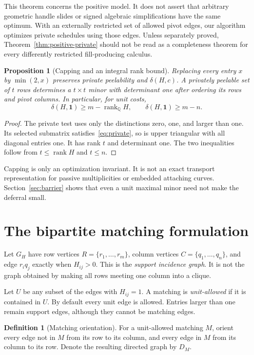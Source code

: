 \documentclass[11pt,a4paper]{article}
\newtheorem{proposition}[theorem]{Proposition}
\theoremstyle{definition}
\newtheorem{definition}[theorem]{Definition}
\theoremstyle{remark}
\begin{document}
This theorem concerns the positive model. It does not assert that arbitrary
geometric handle slides or signed algebraic simplifications have the same
optimum. With an externally restricted set of allowed pivot edges, our
algorithm optimizes private schedules using those edges. Unless separately
proved, Theorem~\ref{thm:positive-private} should not be read as a
completeness theorem for every differently restricted fill-producing
calculus.

\begin{proposition}[Capping and an integral rank bound]
\label{prop:capping}
Replacing every entry $x$ by $\min(2,x)$ preserves private peelability and
$\delta(H,c)$. A privately peelable set of $t$ rows determines a $t\times t$
minor with determinant one after ordering its rows and pivot columns.
In particular, for unit costs,
\[
 \delta(H,\mathbf1)\geq m-\operatorname{rank}_{\mathbb Q}H,
 \qquad
 \delta(H,\mathbf1)\geq m-n.
\]
\end{proposition}
\begin{proof}
The private test uses only the distinctions zero, one, and larger than
one. Its selected submatrix satisfies~\eqref{eq:private}, so is upper
triangular with all diagonal entries one. It has rank $t$ and determinant
one. The two inequalities follow from $t\leq\operatorname{rank}H$ and
$t\leq n$.
\end{proof}

Capping is only an optimization invariant. It is not an exact transport
representation for passive multiplicities or embedded attaching curves.
Section~\ref{sec:barrier} shows that even a unit maximal minor need not make
the deferral small.

\section{The bipartite matching formulation}
\label{sec:matching}

Let $G_H$ have row vertices $R=\{r_1,\ldots,r_m\}$, column vertices
$C=\{q_1,\ldots,q_n\}$, and edge $r_iq_j$ exactly when $H_{ij}>0$.
This is the \emph{support incidence graph}. It is not the graph obtained
by making all rows meeting one column into a clique.

Let $U$ be any subset of the edges with $H_{ij}=1$. A matching is
\emph{unit-allowed} if it is contained in $U$. By default every unit edge
is allowed. Entries larger than one remain support edges, although they
cannot be matching edges.

\begin{definition}[Matching orientation]
For a unit-allowed matching $M$, orient every edge not in $M$ from its row
to its column, and every edge in $M$ from its column to its row. Denote the
resulting directed graph by $D_M$.
\end{definition}
\end{document}
